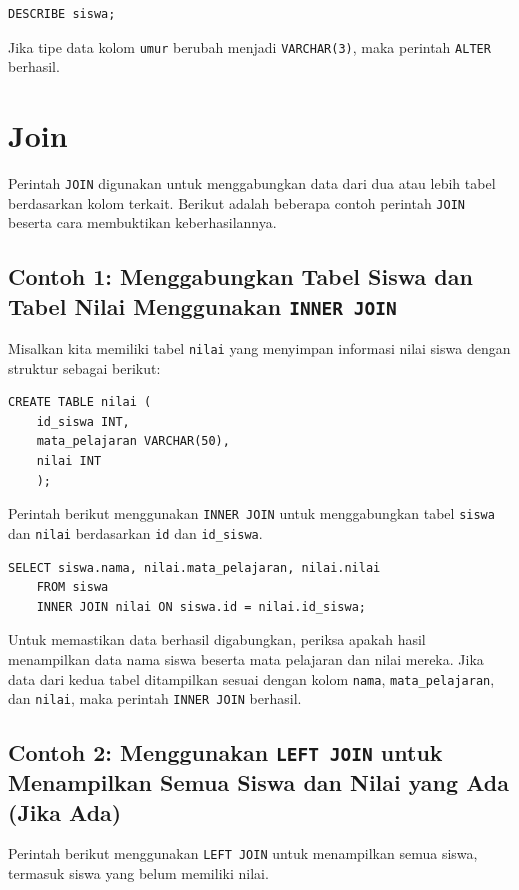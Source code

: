 \begin{lstlisting}[style=sql]
	DESCRIBE siswa;
\end{lstlisting}

Jika tipe data kolom \texttt{umur} berubah menjadi \texttt{VARCHAR(3)}, maka perintah \texttt{ALTER} berhasil.

\section{Join}

Perintah \texttt{JOIN} digunakan untuk menggabungkan data dari dua atau lebih tabel berdasarkan kolom terkait. Berikut adalah beberapa contoh perintah \texttt{JOIN} beserta cara membuktikan keberhasilannya.

\subsection*{Contoh 1: Menggabungkan Tabel Siswa dan Tabel Nilai Menggunakan \texttt{INNER JOIN}}
Misalkan kita memiliki tabel \texttt{nilai} yang menyimpan informasi nilai siswa dengan struktur sebagai berikut:

\begin{lstlisting}[style=sql]
	CREATE TABLE nilai (
	id_siswa INT,
	mata_pelajaran VARCHAR(50),
	nilai INT
	);
\end{lstlisting}

Perintah berikut menggunakan \texttt{INNER JOIN} untuk menggabungkan tabel \texttt{siswa} dan \texttt{nilai} berdasarkan \texttt{id} dan \texttt{id\_siswa}.

\begin{lstlisting}[style=sql]
	SELECT siswa.nama, nilai.mata_pelajaran, nilai.nilai
	FROM siswa
	INNER JOIN nilai ON siswa.id = nilai.id_siswa;
\end{lstlisting}

Untuk memastikan data berhasil digabungkan, periksa apakah hasil menampilkan data nama siswa beserta mata pelajaran dan nilai mereka. Jika data dari kedua tabel ditampilkan sesuai dengan kolom \texttt{nama}, \texttt{mata\_pelajaran}, dan \texttt{nilai}, maka perintah \texttt{INNER JOIN} berhasil.

\subsection*{Contoh 2: Menggunakan \texttt{LEFT JOIN} untuk Menampilkan Semua Siswa dan Nilai yang Ada (Jika Ada)}
Perintah berikut menggunakan \texttt{LEFT JOIN} untuk menampilkan semua siswa, termasuk siswa yang belum memiliki nilai.

